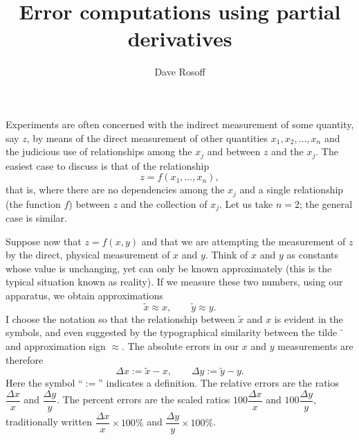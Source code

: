 \documentclass[11pt]{amsart}
\title{Error computations using partial derivatives}
\author{Dave Rosoff}
\begin{document}
\maketitle
\thispagestyle{empty}
\pagestyle{empty}

Experiments are often concerned with the indirect measurement of some quantity, say $z$, by means of the direct measurement of other quantities $x_1, x_2, \ldots, x_n$ and the judicious use of relationships among the $x_j$ and between $z$ and the $x_j$. The easiest case to discuss is that of the relationship
\[
z = f(x_1, \ldots, x_n),
\]
that is, where there are no dependencies among the $x_j$ and a single relationship (the function $f$) between $z$ and the collection of $x_j$. Let us take $n = 2$; the general case is similar.

Suppose now that $z = f(x,y)$ and that we are attempting the measurement of $z$ by the direct, physical measurement of $x$ and $y$. Think of $x$ and $y$ as constants whose value is unchanging, yet can only be known approximately (this is the typical situation known as reality). If we measure these two numbers, using our apparatus, we obtain approximations
\[
\tilde{x} \approx x, \qquad \tilde{y} \approx y.
\]
I choose the notation so that the relationship between $\tilde{x}$ and $x$ is evident in the symbols, and even suggested by the typographical similarity between the tilde $\tilde{\phantom{x}}$ and approximation sign $\approx$. The absolute errors in our $x$ and $y$ measurements are therefore
\[
\Delta x := \tilde{x} - x, \qquad  \Delta y := \tilde{y} - y.
\]
Here the symbol ``$:=$'' indicates a definition. The relative errors are the ratios $\dfrac{\Delta x}{x}$ and $\dfrac{\Delta y}{y}$. The percent errors are the scaled ratios $100 \dfrac{\Delta x}{x}$ and $100 \dfrac{\Delta y}{y}$, traditionally written $\dfrac{\Delta x}{x} \times 100\%$ and $\dfrac{\Delta y}{y} \times 100\%$.
\end{document}
